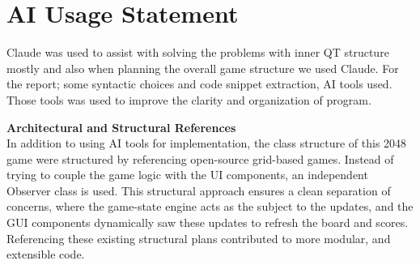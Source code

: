 \documentclass[a4paper,12pt]{article}
\begin{document}
\newpage
\section*{AI Usage Statement}

Claude was used to assist with solving the problems with inner QT structure mostly and also when planning the overall game structure we used Claude. For the report; some syntactic choices and code snippet extraction, AI tools used. Those tools was used to improve the clarity and organization of program.

\noindent \textbf{Architectural and Structural References} \\
In addition to using AI tools for implementation, the 
class structure of this 2048 game were structured by referencing open-source grid-based games. Instead of trying to couple the game logic with the UI components, an independent Observer class is used. This structural approach ensures a clean separation of concerns, where the game-state engine acts as the subject to the updates, and the GUI components dynamically saw these updates to refresh the board and scores. Referencing these existing structural plans contributed to more modular, and extensible code.
\end{document}
